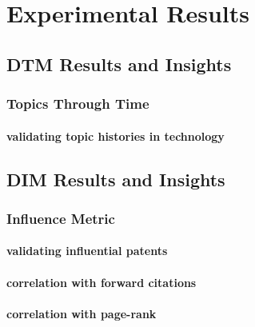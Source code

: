 
\chapter{Experimental Results} %

\label{Chapter4} %


\section{DTM Results and Insights}

\subsection{Topics Through Time}



\subsubsection{validating topic histories in technology}



\section{DIM Results and Insights}

\subsection{Influence Metric}

\subsubsection{validating influential patents}

\subsubsection{correlation with forward citations}

\subsubsection{correlation with page-rank}



